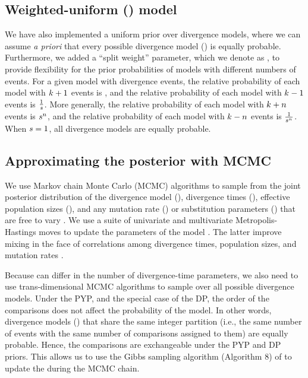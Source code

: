 \documentclass[letterpaper,12pt]{article}
\begin{document}
\subsection{Weighted-uniform (\wunif) model}
We have also implemented a uniform prior over divergence models, where we can
assume \emph{a priori} that every possible divergence model (\etimesets) is
equally probable.
Furthermore, we added a ``split weight'' parameter, which we denote as
\splitweight, to provide flexibility for the prior probabilities of
models with different numbers of events.
For a given model with \nevents divergence events, the relative probability
of each model with $k_{} + 1$ events is \splitweight,
and the relative probability of each model with $k_{} - 1$ events is
$\frac{1}{s}$.
More generally, the relative probability of each model with
$k_{} + n$
events is
$s{}^n$,
and the relative probability of each model with
$k_{} - n$
events is
$\frac{1}{s{}^n}$.
When $s = 1$, all divergence models are equally probable.

\subsection{Approximating the posterior with MCMC}

We use Markov chain Monte Carlo (MCMC) algorithms to sample from the joint
posterior distribution of the divergence model (\etimesets), divergence times
(\etimes), effective population sizes (\epopsize), and any mutation rate
(\murate) or substitution parameters (\gfreq) that are free to vary
\citep{Oaks2018ecoevolity,Oaks2019codemog}.
We use a suite of univariate and multivariate Metropolis-Hastings moves to
update the parameters of the model \citep{Metropolis1953,Hastings1970}.
The latter improve mixing in the face of correlations among divergence times,
population sizes, and mutation rates \citep[see][]{Oaks2018ecoevolity}.

Because \etimesets can differ in the number of divergence-time parameters, we
also need to use trans-dimensional MCMC algorithms to sample over all possible
divergence models.
Under the PYP, and the special case of the DP, the order of the comparisons
does not affect the probability of the model.
In other words, divergence models (\etimesets) that share the same integer
partition (i.e., the same number of events with the same number of comparisons
assigned to them) are equally probable.
Hence, the comparisons are exchangeable under the PYP and DP priors.
This allows us to use the Gibbs sampling algorithm (Algorithm 8) of
\citet{Neal2000} to update the \etimesets during the MCMC chain.
\end{document}
